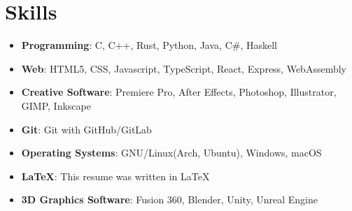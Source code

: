 \documentclass[letterpaper,12pt]{article}
\newcommand{\resumeItem}[2]{
  \item\small{
    \textbf{#1}{: #2 \vspace{-2pt}}
  }
}
\newcommand{\resumeSubItem}[2]{\resumeItem{#1}{#2}\vspace{-4pt}}
\newcommand{\resumeSubHeadingListStart}{\begin{itemize}[leftmargin=*]}
\newcommand{\resumeSubHeadingListEnd}{\end{itemize}}
\begin{document}
\section{Skills}
  \resumeSubHeadingListStart
    \resumeSubItem{Programming}
      {C, C++, Rust, Python, Java, C\#, Haskell}
      \resumeSubItem{Web}
      {HTML5, CSS, Javascript, TypeScript, React, Express, WebAssembly} 
    \resumeSubItem{Creative Software}
      {Premiere Pro, After Effects, Photoshop, Illustrator, GIMP,
      Inkscape}
    \resumeSubItem{Git}
      {Git with GitHub/GitLab}
    \resumeSubItem{Operating Systems}
    {GNU/Linux(Arch, Ubuntu), Windows, macOS}
    \resumeSubItem{\LaTeX}
      {This resume was written in \LaTeX}
    \resumeSubItem{3D Graphics Software}
      {Fusion 360, Blender, Unity, Unreal Engine}
  \resumeSubHeadingListEnd
\end{document}
